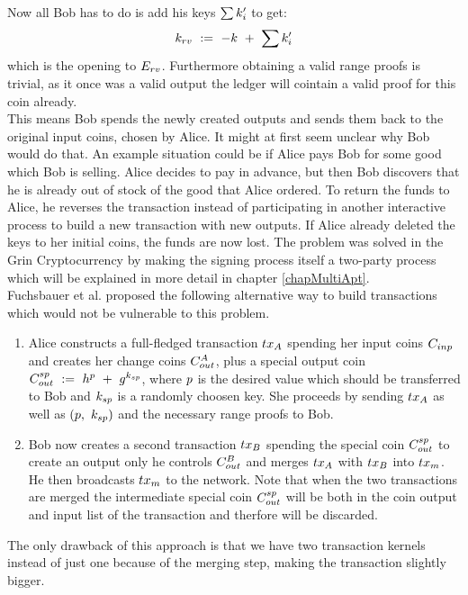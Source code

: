 Now all Bob has to do is add his keys $\sum{k'_i}$ to get:
\[ k_{rv} ~:=~ -k ~+~ \sum{k'_i} \]
which is the opening to $E_{rv}$. Furthermore obtaining a valid range proofs is trivial, as it once was a valid output the ledger will cointain a valid proof for this coin already. \\
This means Bob spends the newly created outputs and sends them back to the original input coins, chosen by Alice. It might at first seem unclear why Bob would do that. An example situation could be if Alice
pays Bob for some good which Bob is selling. Alice decides to pay in advance, but then Bob discovers that he is already out of stock of the good that Alice ordered. To return the funds to Alice, he reverses
the transaction instead of participating in another interactive process to build a new transaction with new outputs. If Alice already deleted the keys to her initial coins, the funds are now lost.
The problem was solved in the Grin Cryptocurrency by making the signing process itself a two-party process which will be explained in more detail in chapter \ref{chapMultiApt}. \\

Fuchsbauer et al. \cite{fuchsbauer2019aggregate} proposed the following alternative way to build transactions which would not be vulnerable to this problem.
\begin{enumerate}
    \item Alice constructs a full-fledged transaction $tx_A$ spending her input coins $C_{inp}$ and creates her change coins $C_{out}^A$, plus a special output coin $C_{out}^{sp} ~:=~ h^{p} ~+~ g^{k_{sp}}$,
    where $p$ is the desired value which should be transferred to Bob and $k_{sp}$ is a randomly choosen key. She proceeds by sending $tx_A$ as well as $(p ,~ k_{sp})$ and the necessary range
    proofs to Bob.
    \item Bob now creates a second transaction $tx_B$ spending the special coin $C_{out}^{sp}$ to create an output only he controls $C_{out}^{B}$ and merges $tx_A$ with $tx_B$
    into $tx_m$. He then broadcasts $tx_m$ to the network. Note that when the two transactions are merged the intermediate special coin $C_{out}^{sp}$ will be both in the coin output and input list
    of the transaction and therfore will be discarded.
\end{enumerate}
The only drawback of this approach is that we have two transaction kernels instead of just one because of the merging step, making the transaction slightly bigger.


